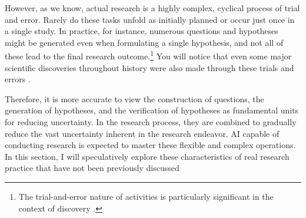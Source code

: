 However, as we know, actual research is a highly complex, cyclical process of trial and error. Rarely do these tasks unfold as initially planned or occur just once in a single study. In practice, for instance, numerous questions and hypotheses might be generated even when formulating a single hypothesis, and not all of these lead to the final research outcome.\footnote{
The trial-and-error nature of activities is particularly significant in the context of discovery \cite{yanai2020hypothesis}.
} You will notice that even some major scientific discoveries throughout history were also made through these trials and errors \cite{hanson1965patterns,gribbin2022origin,whiteside1970before}.

Therefore, it is more accurate to view the construction of questions, the generation of hypotheses, and the verification of hypotheses as fundamental units for reducing uncertainty. In the research process, they are combined to gradually reduce the vast uncertainty inherent in the research endeavor. AI capable of conducting research is expected to master these flexible and complex operations. In this section, I will speculatively explore these characteristics of real research practice that have not been previously discussed




